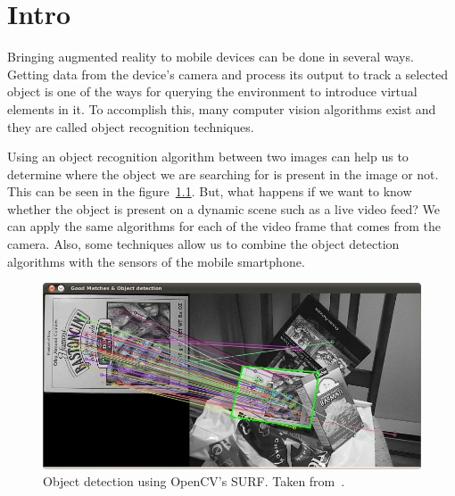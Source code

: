 \chapter{Intro}

Bringing augmented reality to mobile devices can be done in several ways. Getting
data from the device's camera and process its output to track a selected object is
one of the ways for querying the environment to introduce virtual elements in it. To
accomplish this, many computer vision algorithms exist and they are called object
recognition techniques.  

Using an object recognition algorithm between two images can help us to
determine where the object we are searching for is present in the image or
not. This can be seen in the figure~\ref{fig:introdetect}. But, what happens if
we want to know whether the object is present on a dynamic scene such as a
live video feed? We can apply the same algorithms for each of the video frame
that comes from the camera. Also, some techniques allow us to combine the object
detection algorithms with the sensors of the mobile smartphone.

\begin{figure}
\centering
\includegraphics[scale=0.45]{img/intro-feature.jpg}
\caption{\label{fig:introdetect} Object detection using OpenCV's SURF. Taken
  from~\cite{opencvhomography}.} 
\end{figure} 

